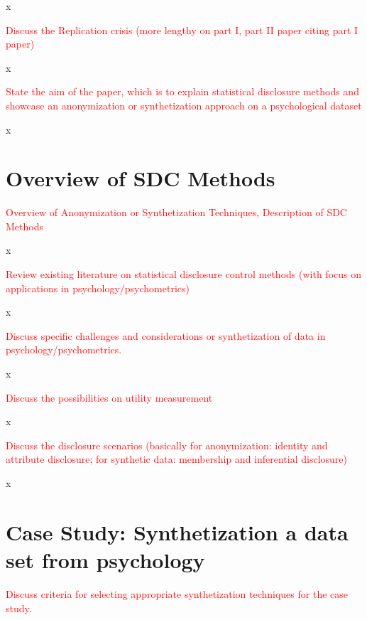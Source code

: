 \documentclass{article}
\begin{document}
x

\textcolor{red}{Discuss the Replication crisis (more lengthy on part I, part II paper citing part I paper)}

x

\textcolor{red}{State the aim of the paper, which is to explain statistical disclosure methods and showcase an anonymization or synthetization approach on a psychological dataset}

x

\section{Overview of SDC Methods}

\textcolor{red}{Overview of Anonymization or Synthetization Techniques, Description of SDC Methods}

x

\textcolor{red}{Review existing literature on statistical disclosure control methods (with focus on applications in psychology/psychometrics)}

x

\textcolor{red}{Discuss specific challenges and considerations or synthetization of data in psychology/psychometrics.}

x

\textcolor{red}{Discuss the possibilities on utility measurement}

x

\textcolor{red}{Discuss the disclosure scenarios (basically for anonymization: identity and attribute disclosure; for synthetic data: membership and inferential disclosure)}

x

\section{Case Study: Synthetization a data set from psychology}

\textcolor{red}{Discuss criteria for selecting appropriate synthetization techniques for the case study.}
\end{document}
